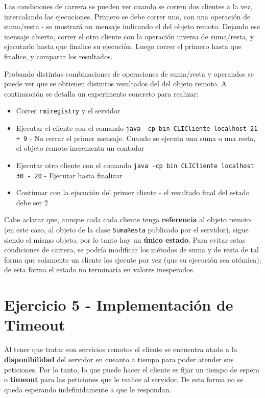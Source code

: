 Las condiciones de carrera se pueden ver cuando se corren dos clientes a la vez, intercalando las ejecuciones. Primero se debe correr uno, con una operación de suma/resta - se mostrará un mensaje indicando el  del objeto remoto. Dejando ese mensaje abierto, correr el otro cliente con la operación inversa de suma/resta, y ejecutarlo hasta que finalice su ejecución. Luego correr el primero hasta que finalice, y comparar los resultados.

Probando distintas combinaciones de operaciones de suma/resta y operandos se puede ver que se obtienen distintos resultados del  del objeto remoto. A continuación se detalla un experimento concreto para realizar:

\begin{itemize}
    \item Correr \texttt{rmiregistry} y el servidor 
    \item Ejecutar el cliente con el comando \texttt{java -cp bin CLICliente localhost 21 + 9} - No cerrar el primer mensaje. Cuando se ejecuta una suma o una resta, el objeto remoto incrementa un contador
    \item Ejecutar otro cliente con el comando \texttt{java -cp bin CLICliente localhost 30 - 20} - Ejecutar hasta finalizar
    \item Continuar con la ejecución del primer cliente - el resultado final del estado debe ser 2
\end{itemize}

Cabe aclarar que, aunque cada cada cliente tenga \textbf{referencia} al objeto remoto (en este caso, al objeto de la clase \texttt{SumaResta} publicado por el servidor), sigue siendo el mismo objeto, por lo tanto hay un \textbf{único estado}. Para evitar estas condiciones de carrera, se podría modificar los métodos de suma y de resta de tal forma que solamente un cliente los ejecute por vez (que su ejecución sea atómica); de esta forma el estado no terminaría en valores inesperados.  


\section{Ejercicio 5 - Implementación de Timeout}

Al tener que tratar con servicios remotos el cliente se encuentra atado a la \textbf{disponibilidad} del servidor en cueanto a tiempo para poder atender sus peticiones. Por lo tanto, lo que puede hacer el cliente es fijar un tiempo de espera o \textbf{timeout} para las peticiones que le realice al servidor. De esta forma no se queda esperando indefinidamente a que le respondan.

